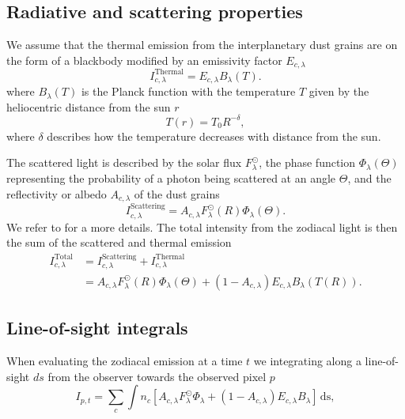 \documentclass{aa}
\begin{document}
\subsection{Radiative and scattering properties}
We assume that the thermal emission from the interplanetary dust grains are on the form of a blackbody modified by an emissivity factor $E_{c, \lambda}$
\begin{equation}
    I^\mathrm{Thermal}_{c,\lambda} = E_{c,\lambda} B_\lambda(T).
\end{equation}
where $B_\lambda(T)$ is the Planck function with the temperature $T$ given by the heliocentric distance from the sun $r$
\begin{equation}
    T(r) = T_0 R^{-\delta},
\end{equation}
where $\delta$ describes how the temperature decreases with distance from the sun.

The scattered light is described by the solar flux $F_\lambda^\odot$, the phase function $\Phi_\lambda(\Theta)$ representing the probability of a photon being scattered at an angle $\Theta$, and the reflectivity or albedo $A_{c, \lambda}$ of the dust grains
\begin{equation}\label{eq: scat_term}
    I^\mathrm{Scattering}_{c, \lambda} = A_{c, \lambda} F_\lambda^\odot(R) \Phi_\lambda(\Theta).
\end{equation}
We refer to \cite{ZODIPY} for a more details. The total intensity from the zodiacal light is then the sum of the scattered and thermal emission
\begin{align}
    I^\mathrm{Total}_{c, \lambda} &= I^\mathrm{Scattering}_{c,\lambda} + I^\mathrm{Thermal}_{c,\lambda}\\
    &= A_{c, \lambda} F_\lambda^\odot(R) \Phi_\lambda(\Theta) + \left( 1 - A_{c, \lambda} \right) E_{c,\lambda} B_\lambda(T(R)).
\end{align}

\subsection{Line-of-sight integrals}
When evaluating the zodiacal emission at a time $t$ we integrating along a line-of-sight $ds$ from the observer towards the observed pixel $p$
\begin{equation}\label{eq: intensity}
    I_{p,t} = \sum_c \int n_c \left[  A_{c, \lambda} F_\lambda^\odot \Phi_\lambda + \left( 1 - A_{c, \lambda} \right) E_{c,\lambda} B_\lambda \right]\,\mathrm {ds},
\end{equation}
\end{document}
